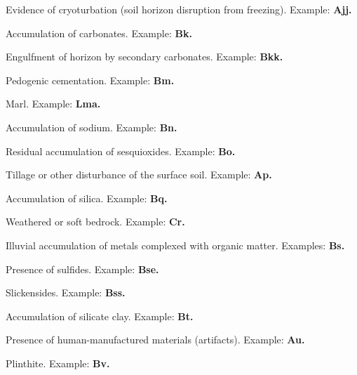 \documentclass[12pt]{exam}
\begin{document}
\begin{description}[labelsep=1.80em, align=right]
\item[jj]
Evidence of cryoturbation (soil horizon disruption from freezing). Example: \textbf{Ajj.}
\vspace{0.1in}
\item[k]
Accumulation of carbonates. Example: \textbf{Bk.}
\vspace{0.1in}
\item[kk]
Engulfment of horizon by secondary carbonates. Example: \textbf{Bkk.}
\vspace{0.1in}
\item[m] 
Pedogenic cementation. Example: \textbf{Bm.}
\vspace{0.1in}
\item[ma]
Marl. Example: \textbf{Lma.}
\vspace{0.1in}
\item[n] 
Accumulation of sodium. Example: \textbf{Bn.}
\vspace{0.1in}
\item[o]
Residual accumulation of sesquioxides. Example: \textbf{Bo.}
\vspace{0.1in}
\item[p]
Tillage or other disturbance of the surface soil. Example: \textbf{Ap.}
\vspace{0.1in}
\item[q] 
Accumulation of silica. Example: \textbf{Bq.}
\vspace{0.1in}
\item[r] 
Weathered or soft bedrock. Example: \textbf{Cr.}
\vspace{0.1in}
\item[s]
Illuvial accumulation of metals complexed with organic matter. Examples: \textbf{Bs.}
\vspace{0.1in}
\item[se]
Presence of sulfides. Example: \textbf{Bse.}
\vspace{0.1in}
\item[ss]
Slickensides. Example: \textbf{Bss.}
\vspace{0.1in}
\item[t]
Accumulation of silicate clay. Example: \textbf{Bt.}
\vspace{0.1in}
\item[u]
Presence of human-manufactured materials (artifacts). Example: \textbf{Au.}
\vspace{0.1in}
\item[v] 
Plinthite. Example: \textbf{Bv.}
\vspace{0.1in}
\item[w] 

\end{description}
\end{document}
